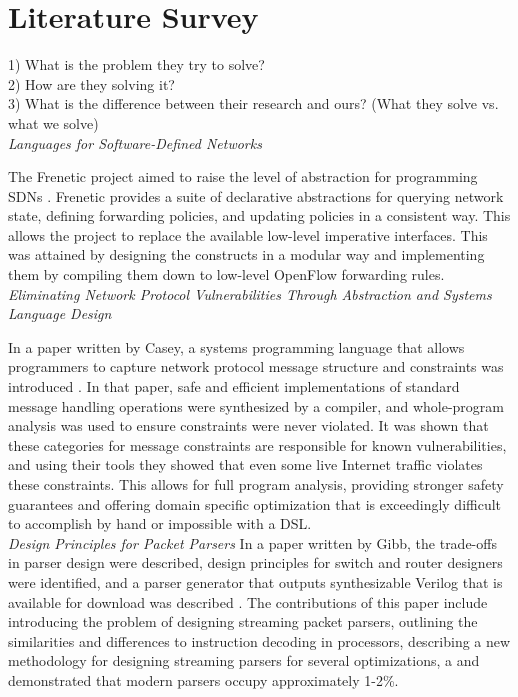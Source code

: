 
\section{Literature Survey}
1) What is the problem they try to solve? \\
2) How are they solving it? \\
3) What is the difference between their research and ours?  (What they solve vs.
what we solve) \\


\noindent \emph{Languages for Software-Defined Networks}

The Frenetic project aimed to raise the level of abstraction for 
programming SDNs \cite{Foster2013}. Frenetic provides a suite of declarative
abstractions 
for querying network state, defining forwarding policies, and updating 
policies in a consistent way. This allows the project to replace the 
available low-level imperative interfaces. This was attained by designing 
the constructs in a modular way and implementing them by compiling
them down to low-level OpenFlow forwarding rules. \\

\noindent \emph{Eliminating Network Protocol Vulnerabilities Through Abstraction
	and Systems Language Design}

In a paper written by Casey, a systems programming language that allows
programmers to capture network protocol message structure and constraints was
introduced \cite{Casey2013}. In that paper, safe and efficient implementations
of standard message handling operations were synthesized by a compiler, and
whole-program analysis was used to ensure constraints were never violated. It
was shown that these categories for message constraints are responsible for known
vulnerabilities, and using their tools they showed that even some live Internet traffic 
violates these constraints.
This allows for full program analysis, providing stronger safety guarantees and offering 
domain 
specific optimization that is exceedingly difficult to accomplish by hand or impossible
with a DSL. \\ 

\noindent \emph{Design Principles for Packet Parsers}
In a paper written by Gibb, the trade-offs in parser design were described, design
principles for switch and router designers were identified, and a parser generator that
outputs synthesizable Verilog that is available for download was described
\cite{Gibb2013}. The
contributions of this paper include introducing the problem of designing streaming packet
parsers, outlining the similarities and differences to instruction decoding in processors,
describing a new methodology for designing streaming parsers for several optimizations, a
and demonstrated that modern parsers occupy approximately 1-2\%. \\

